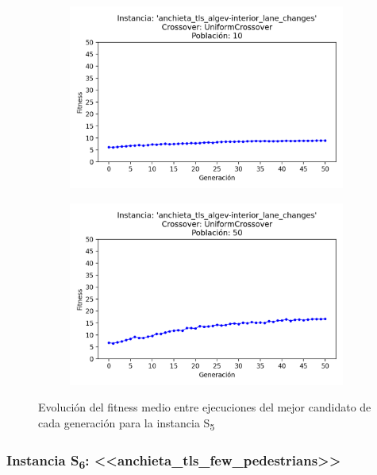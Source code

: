 \begin{figure}[h]
\begin{subfigure}[t]{.49\textwidth}
      \includegraphics[width=\textwidth]{report/images/estudio/anchieta_tls_algev-interior_lane_changes-UniformCrossover-10.png}
    \end{subfigure}
    \hfill
    \begin{subfigure}[t]{.49\textwidth}
      \centering
      \includegraphics[width=\textwidth]{report/images/estudio/anchieta_tls_algev-interior_lane_changes-UniformCrossover-50.png}
    \end{subfigure}
    \caption{Evolución del fitness medio entre ejecuciones del mejor candidato de cada generación para la instancia S\textsubscript{5}}
    \label{fig:estudio:anchieta_tls_interior_lane_changes}
\end{figure}



\subsubsection{Instancia S\textsubscript{6}: <<anchieta\_tls\_few\_pedestrians>>}

